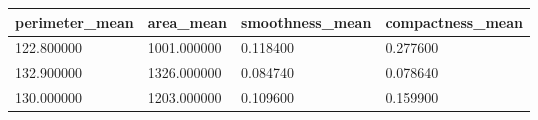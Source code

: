 \begin{tabular}{p{2.5cm}p{2cm}p{2.5cm}p{2cm}}
\toprule
perimeter\_mean & area\_mean & smoothness\_mean & compactness\_mean \\
\midrule
122.800000 & 1001.000000 & 0.118400 & 0.277600 \\
132.900000 & 1326.000000 & 0.084740 & 0.078640 \\
130.000000 & 1203.000000 & 0.109600 & 0.159900 \\
\bottomrule
\end{tabular} 